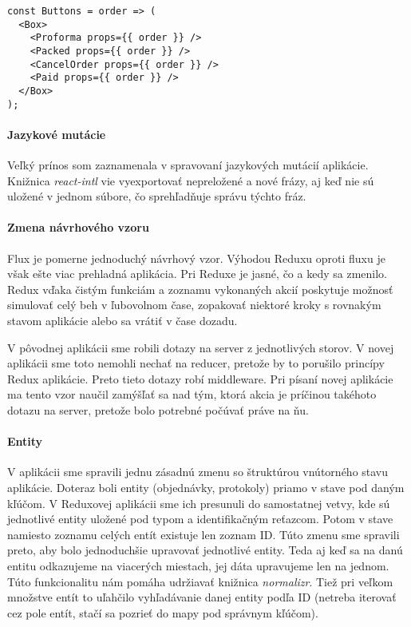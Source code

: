 \begin{lstlisting}[caption=Pole komponentov v JavaScripte s použitím knižnice Redux]
const Buttons = order => (
  <Box>
    <Proforma props={{ order }} />
    <Packed props={{ order }} />
    <CancelOrder props={{ order }} />
    <Paid props={{ order }} />
  </Box>
);
\end{lstlisting}

\paragraph{Jazykové mutácie}
Veľký prínos som zaznamenala v spravovaní jazykových mutácií aplikácie. Knižnica \emph{react-intl} vie vyexportovať nepreložené a nové frázy, aj keď nie sú uložené v jednom súbore, čo sprehľadňuje správu týchto fráz.

\paragraph{Zmena návrhového vzoru}
Flux je pomerne jednoduchý návrhový vzor. Výhodou Reduxu oproti fluxu je však ešte viac prehladná aplikácia. Pri Reduxe je jasné, čo a kedy sa zmenilo. Redux vďaka čistým funkciám a zoznamu vykonaných akcií poskytuje možnosť simulovať celý beh v ľubovolnom čase, zopakovať niektoré kroky s rovnakým stavom aplikácie alebo sa vrátiť v čase dozadu.

V pôvodnej aplikácii sme robili dotazy na server z jednotlivých storov. V novej aplikácii sme toto nemohli nechať na reducer, pretože by to porušilo princípy Redux aplikácie. Preto tieto dotazy robí middleware. Pri písaní novej aplikácie ma tento vzor naučil zamýšľať sa nad tým, ktorá akcia je príčinou takéhoto dotazu na server, pretože bolo potrebné počúvať práve na ňu.

%


\paragraph{Entity}%
V aplikácii sme spravili jednu zásadnú zmenu so štruktúrou vnútorného stavu aplikácie. Doteraz boli entity (objednávky, protokoly) priamo v stave pod daným kľúčom. 
V Reduxovej aplikácii sme ich presunuli do samostatnej vetvy, kde sú jednotlivé entity uložené pod typom a identifikačným reťazcom. Potom v stave namiesto zoznamu celých entít existuje len zoznam ID. 
Túto zmenu sme spravili preto, aby bolo jednoduchšie upravovať jednotlivé entity. Teda aj keď sa na danú entitu odkazujeme na viacerých miestach, jej dáta upravujeme len na jednom. Túto funkcionalitu nám pomáha udržiavať knižnica \emph{normalizr}.
Tiež pri veľkom množstve entít to uľahčilo vyhľadávanie danej entity podľa ID (netreba iterovať cez pole entít, stačí sa pozrieť do mapy pod správnym kľúčom).

